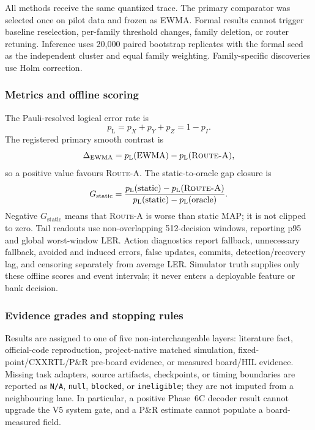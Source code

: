 \documentclass[11pt]{article}
\newcommand{\RouteA}{\textsc{Route-A}}
\newcommand{\pL}{p_{\mathrm L}}
\begin{document}
All methods receive the same quantized trace.  The primary comparator was
selected once on pilot data and frozen as EWMA.  Formal results cannot trigger
baseline reselection, per-family threshold changes, family deletion, or router
retuning.  Inference uses 20,000 paired bootstrap replicates with the formal
seed as the independent cluster and equal family weighting.  Family-specific
discoveries use Holm correction.

\subsubsection{Metrics and offline scoring}

The Pauli-resolved logical error rate is
\begin{equation}
  \pL = p_X+p_Y+p_Z = 1-p_I.
\end{equation}
The registered primary smooth contrast is
\begin{equation}
  \Delta_{\mathrm{EWMA}}=
  \pL(\mathrm{EWMA})-\pL(\RouteA{}),
\end{equation}
so a positive value favours \RouteA{}.  The static-to-oracle gap closure is
\begin{equation}
  G_{\mathrm{static}}=
  \frac{\pL(\mathrm{static})-\pL(\RouteA{})}
       {\pL(\mathrm{static})-\pL(\mathrm{oracle})}.
\end{equation}
Negative $G_{\mathrm{static}}$ means that \RouteA{} is worse than static MAP;
it is not clipped to zero.  Tail readouts use non-overlapping 512-decision
windows, reporting p95 and global worst-window LER.  Action diagnostics report
fallback, unnecessary fallback, avoided and induced errors, false updates,
commits, detection/recovery lag, and censoring separately from average LER.
Simulator truth supplies only these offline scores and event intervals; it
never enters a deployable feature or bank decision.

\subsubsection{Evidence grades and stopping rules}

Results are assigned to one of five non-interchangeable layers: literature
fact, official-code reproduction, project-native matched simulation,
fixed-point/CXXRTL/P\&R pre-board evidence, or measured board/HIL evidence.
Missing task adapters, source artifacts, checkpoints, or timing boundaries are
reported as \texttt{N/A}, \texttt{null}, \texttt{blocked}, or
\texttt{ineligible}; they are not imputed from a neighbouring lane.  In
particular, a positive Phase~6C decoder result cannot upgrade the V5 system
gate, and a P\&R estimate cannot populate a board-measured field.
\end{document}

